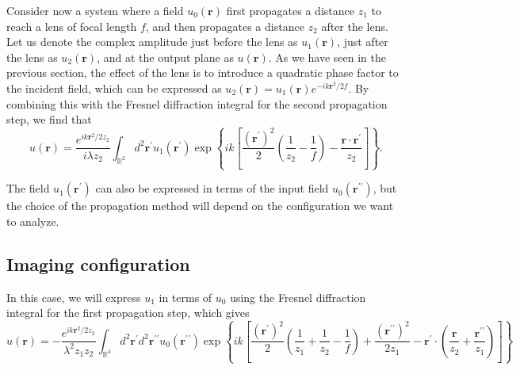 \documentclass[a4paper,10pt]{article}
\begin{document}
Consider now a system where a field $u_0(\mathbf{r})$ first propagates a distance $z_1$ to reach a lens of focal length $f$, and then propagates a distance $z_2$ after the lens. Let us denote the complex amplitude just before the lens as $u_1(\mathbf{r})$, just after the lens as $u_2(\mathbf{r})$, and at the output plane as $u(\mathbf{r})$. As we have seen in the previous section, the effect of the lens is to introduce a quadratic phase factor to the incident field, which can be expressed as $u_2(\mathbf{r}) = u_1(\mathbf{r}) e^{-i k \mathbf{r}^2 / 2 f}$. By combining this with the Fresnel diffraction integral for the second propagation step, we find that
\begin{equation}
    u(\mathbf{r}) = \frac{e^{i k \mathbf{r}^2 / 2 z_2}}{i\lambda z_2} \int_{\mathbb{R}^2} d^2\mathbf{r}^\prime u_1(\mathbf{r}^\prime) \exp\left\{ ik \left[ \frac{(\mathbf{r}^\prime)^2}{2} \left(\frac{1}{z_2} - \frac{1}{f}\right) - \frac{\mathbf{r} \cdot \mathbf{r}^\prime}{z_2} \right]  \right\}.
\end{equation}

The field $u_1(\mathbf{r}^\prime)$ can also be expressed in terms of the input field $u_0(\mathbf{r}^{\prime \prime})$, but the choice of the propagation method will depend on the configuration we want to analyze. 

\subsection{Imaging configuration}

In this case, we will express $u_1$ in terms of $u_0$ using the Fresnel diffraction integral for the first propagation step, which gives
\begin{equation}
    u(\mathbf{r}) = -\frac{e^{i k \mathbf{r}^2 / 2 z_2}}{\lambda^2 z_1 z_2}  \int_{\mathbb{R}^4} d^2\mathbf{r}^\prime d^2\mathbf{r}^{\prime \prime} u_0(\mathbf{r}^{\prime \prime}) \exp\left\{ ik \left[ \frac{(\mathbf{r}^\prime)^2}{2}\left( \frac{1}{z_1} + \frac{1}{z_2} - \frac{1}{f} \right) +\frac{(\mathbf{r}^{\prime \prime})^2}{2z_1} - \mathbf{r}^\prime \cdot \left( \frac{\mathbf{r}}{z_2} + \frac{\mathbf{r}^{\prime \prime}}{z_1} \right) \right] \right\}
\end{equation}
\end{document}
